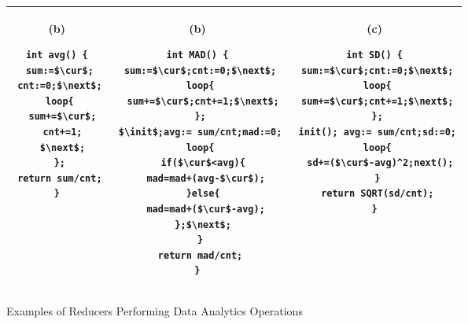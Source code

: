 \begin{figure}
	\centering
	\lstset{language=C,
		basicstyle=\ttfamily\scriptsize}
	\begin{tabular}{|c|c|c|}
		\hline
		\begin{minipage}[t]{0.2\textwidth}
			(b)
			\begin{lstlisting}[mathescape=true]
int avg() {
 sum:=$\cur$;
 cnt:=0;$\next$;
 loop{
  sum+=$\cur$;
  cnt+=1;
  $\next$;
 };
 return sum/cnt;
}
			\end{lstlisting}
		\end{minipage}&
		\begin{minipage}[t]{0.4\textwidth}
			(b)
\begin{lstlisting}[mathescape=true]
int MAD() {
 sum:=$\cur$;cnt:=0;$\next$;
 loop{
  sum+=$\cur$;cnt+=1;$\next$;
 };
 $\init$;avg:= sum/cnt;mad:=0;
 loop{
  if($\cur$<avg){
   mad=mad+(avg-$\cur$);
  }else{
   mad=mad+($\cur$-avg);
  };$\next$;
 }
 return mad/cnt;
}
\end{lstlisting}
		\end{minipage}&
		\begin{minipage}[t]{0.4\textwidth}
			(c)
			\begin{lstlisting}[mathescape=true]
int SD() {
 sum:=$\cur$;cnt:=0;$\next$;
 loop{
 sum+=$\cur$;cnt+=1;$\next$;
 };
 init(); avg:= sum/cnt;sd:=0;
 loop{
  sd+=($\cur$-avg)^2;next();
 }
 return SQRT(sd/cnt);
}
			\end{lstlisting}
		\end{minipage}\\
		\hline		
	\end{tabular}
	\caption{Examples of Reducers Performing Data Analytics Operations}
	\label{fig:examples}
\end{figure}